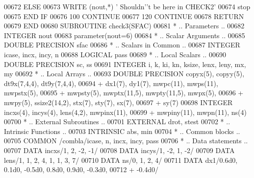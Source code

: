 \begin{DoxyCode}
00672             \textcolor{keywordflow}{ELSE}
00673                \textcolor{keyword}{WRITE} (nout,*) \textcolor{stringliteral}{' Shouldn'}\textcolor{stringliteral}{'t be here in CHECK2'}
00674                stop
00675 \textcolor{keywordflow}{            END IF}
00676   100    \textcolor{keywordflow}{CONTINUE}
00677   120 \textcolor{keywordflow}{CONTINUE}
00678       \textcolor{keywordflow}{RETURN}
00679 \textcolor{keyword}{      END}
00680 \textcolor{keyword}{      SUBROUTINE }check3(SFAC)
00681 \textcolor{comment}{*     .. Parameters ..}
00682       \textcolor{keywordtype}{INTEGER}           nout
00683       parameter(nout=6)
00684 \textcolor{comment}{*     .. Scalar Arguments ..}
00685       \textcolor{keywordtype}{DOUBLE PRECISION}  sfac
00686 \textcolor{comment}{*     .. Scalars in Common ..}
00687       \textcolor{keywordtype}{INTEGER}           icase, incx, incy, n
00688       \textcolor{keywordtype}{LOGICAL}           pass
00689 \textcolor{comment}{*     .. Local Scalars ..}
00690       \textcolor{keywordtype}{DOUBLE PRECISION}  sc, ss
00691       \textcolor{keywordtype}{INTEGER}           i, k, ki, kn, ksize, lenx, leny, mx, my
00692 \textcolor{comment}{*     .. Local Arrays ..}
00693       \textcolor{keywordtype}{DOUBLE PRECISION}  copyx(5), copyy(5), dt9x(7,4,4), dt9y(7,4,4),
00694      +                  dx1(7), dy1(7), mwpc(11), mwps(11), mwpstx(5),
00695      +                  mwpsty(5), mwptx(11,5), mwpty(11,5), mwpx(5),
00696      +                  mwpy(5), ssize2(14,2), stx(7), sty(7), sx(7),
00697      +                  sy(7)
00698       \textcolor{keywordtype}{INTEGER}           incxs(4), incys(4), lens(4,2), mwpinx(11),
00699      +                  mwpiny(11), mwpn(11), ns(4)
00700 \textcolor{comment}{*     .. External Subroutines ..}
00701       \textcolor{keywordtype}{EXTERNAL}          drot, stest
00702 \textcolor{comment}{*     .. Intrinsic Functions ..}
00703       \textcolor{keywordtype}{INTRINSIC}         abs, min
00704 \textcolor{comment}{*     .. Common blocks ..}
00705       \textcolor{keyword}{COMMON}            /combla/icase, n, incx, incy, pass
00706 \textcolor{comment}{*     .. Data statements ..}
00707       \textcolor{keyword}{DATA}              incxs/1, 2, -2, -1/
00708       \textcolor{keyword}{DATA}              incys/1, -2, 1, -2/
00709       \textcolor{keyword}{DATA}              lens/1, 1, 2, 4, 1, 1, 3, 7/
00710       \textcolor{keyword}{DATA}              ns/0, 1, 2, 4/
00711       \textcolor{keyword}{DATA}              dx1/0.6d0, 0.1d0, -0.5d0, 0.8d0, 0.9d0, -0.3d0,
00712      +                  -0.4d0/

\end{DoxyCode}
